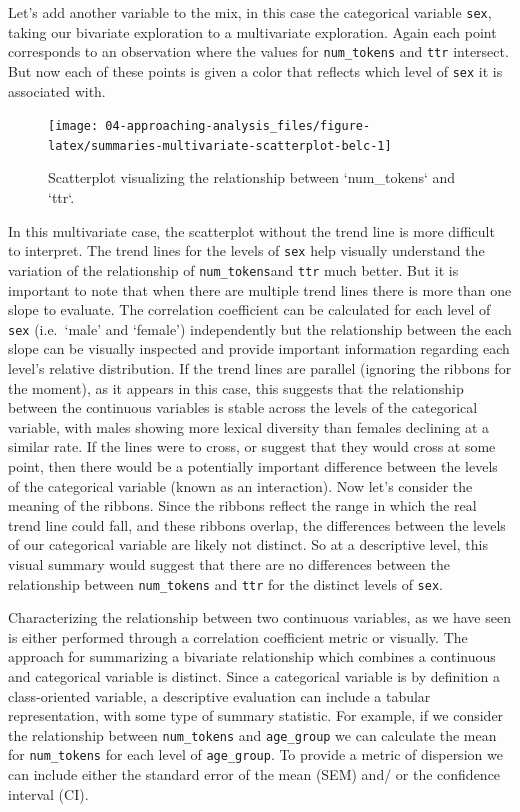 \documentclass[
]{article}
\begin{document}
Let's add another variable to the mix, in this case the categorical variable \texttt{sex}, taking our bivariate exploration to a multivariate exploration. Again each point corresponds to an observation where the values for \texttt{num\_tokens} and \texttt{ttr} intersect. But now each of these points is given a color that reflects which level of \texttt{sex} it is associated with.

\begin{figure}

{\centering \texttt{[image: 04-approaching-analysis\_files/figure-latex/summaries-multivariate-scatterplot-belc-1]} 

}

\caption{Scatterplot visualizing the relationship between `num\_tokens` and `ttr`.}\label{fig:summaries-multivariate-scatterplot-belc}
\end{figure}

In this multivariate case, the scatterplot without the trend line is more difficult to interpret. The trend lines for the levels of \texttt{sex} help visually understand the variation of the relationship of \texttt{num\_tokens}and \texttt{ttr} much better. But it is important to note that when there are multiple trend lines there is more than one slope to evaluate. The correlation coefficient can be calculated for each level of \texttt{sex} (i.e.~`male' and `female') independently but the relationship between the each slope can be visually inspected and provide important information regarding each level's relative distribution. If the trend lines are parallel (ignoring the ribbons for the moment), as it appears in this case, this suggests that the relationship between the continuous variables is stable across the levels of the categorical variable, with males showing more lexical diversity than females declining at a similar rate. If the lines were to cross, or suggest that they would cross at some point, then there would be a potentially important difference between the levels of the categorical variable (known as an interaction). Now let's consider the meaning of the ribbons. Since the ribbons reflect the range in which the real trend line could fall, and these ribbons overlap, the differences between the levels of our categorical variable are likely not distinct. So at a descriptive level, this visual summary would suggest that there are no differences between the relationship between \texttt{num\_tokens} and \texttt{ttr} for the distinct levels of \texttt{sex}.

Characterizing the relationship between two continuous variables, as we have seen is either performed through a correlation coefficient metric or visually. The approach for summarizing a bivariate relationship which combines a continuous and categorical variable is distinct. Since a categorical variable is by definition a class-oriented variable, a descriptive evaluation can include a tabular representation, with some type of summary statistic. For example, if we consider the relationship between \texttt{num\_tokens} and \texttt{age\_group} we can calculate the mean for \texttt{num\_tokens} for each level of \texttt{age\_group}. To provide a metric of dispersion we can include either the standard error of the mean (SEM) and/ or the confidence interval (CI).
\end{document}
